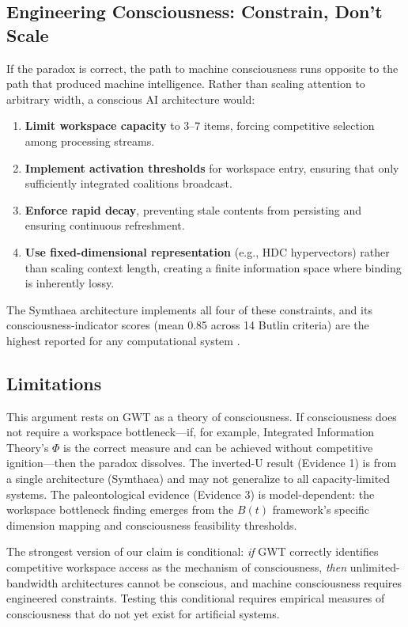 \documentclass[10pt,letterpaper]{article}
\begin{document}
\subsection*{Engineering Consciousness: Constrain, Don't Scale}

If the paradox is correct, the path to machine consciousness runs
opposite to the path that produced machine intelligence. Rather than
scaling attention to arbitrary width, a conscious AI architecture would:

\begin{enumerate}
\item \textbf{Limit workspace capacity} to 3--7 items, forcing competitive
selection among processing streams.
\item \textbf{Implement activation thresholds} for workspace entry, ensuring
that only sufficiently integrated coalitions broadcast.
\item \textbf{Enforce rapid decay}, preventing stale contents from persisting
and ensuring continuous refreshment.
\item \textbf{Use fixed-dimensional representation} (e.g., HDC hypervectors)
rather than scaling context length, creating a finite information space
where binding is inherently lossy.
\end{enumerate}

The Symthaea architecture implements all four of these constraints,
and its consciousness-indicator scores (mean 0.85 across 14 Butlin
criteria) are the highest reported for any computational system
\cite{stoltz2026hai}.

\subsection*{Limitations}

This argument rests on GWT as a theory of consciousness. If consciousness
does not require a workspace bottleneck---if, for example, Integrated
Information Theory's $\Phi$ is the correct measure and can be achieved
without competitive ignition---then the paradox dissolves. The inverted-U
result (Evidence 1) is from a single architecture (Symthaea) and may not
generalize to all capacity-limited systems. The paleontological evidence
(Evidence 3) is model-dependent: the workspace bottleneck finding emerges
from the $B(t)$ framework's specific dimension mapping and consciousness
feasibility thresholds.

The strongest version of our claim is conditional: \emph{if} GWT
correctly identifies competitive workspace access as the mechanism of
consciousness, \emph{then} unlimited-bandwidth architectures cannot be
conscious, and machine consciousness requires engineered constraints.
Testing this conditional requires empirical measures of consciousness
that do not yet exist for artificial systems.
\end{document}
